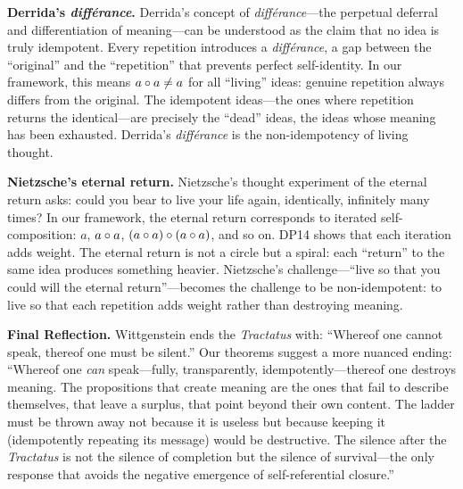 \textbf{Derrida's \textit{diff\'erance}.} Derrida's concept of
\textit{diff\'erance}---the perpetual deferral and differentiation of
meaning---can be understood as the claim that no idea is truly
idempotent. Every repetition introduces a \textit{diff\'erance}, a
gap between the ``original'' and the ``repetition'' that prevents
perfect self-identity. In our framework, this means
$a \circ a \neq a$ for all ``living'' ideas: genuine repetition
always differs from the original. The idempotent ideas---the ones
where repetition returns the identical---are precisely the ``dead''
ideas, the ideas whose meaning has been exhausted. Derrida's
\textit{diff\'erance} is the non-idempotency of living thought.

\textbf{Nietzsche's eternal return.} Nietzsche's thought experiment of
the eternal return asks: could you bear to live your life again,
identically, infinitely many times? In our framework, the eternal return
corresponds to iterated self-composition: $a$, $a \circ a$,
$(a \circ a) \circ (a \circ a)$, and so on. DP14 shows that
each iteration adds weight. The eternal return is not a circle but a
spiral: each ``return'' to the same idea produces something heavier.
Nietzsche's challenge---``live so that you could will the eternal
return''---becomes the challenge to be non-idempotent: to live so that
each repetition adds weight rather than destroying meaning.

\begin{reflectionbox}
\textbf{Final Reflection.}
Wittgenstein ends the \textit{Tractatus} with: ``Whereof one cannot
speak, thereof one must be silent.'' Our theorems suggest a more
nuanced ending: ``Whereof one \emph{can} speak---fully, transparently,
idempotently---thereof one destroys meaning. The propositions that
create meaning are the ones that fail to describe themselves, that
leave a surplus, that point beyond their own content. The ladder must
be thrown away not because it is useless but because keeping it
(idempotently repeating its message) would be destructive. The silence
after the \textit{Tractatus} is not the silence of completion but the
silence of survival---the only response that avoids the negative
emergence of self-referential closure.''
\end{reflectionbox}



